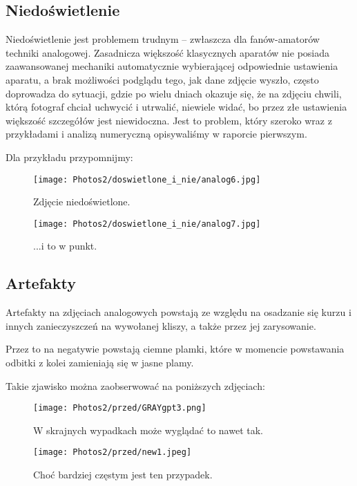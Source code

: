 \documentclass[]{mwart}
\begin{document}
\subsection{Niedoświetlenie} %
Niedoświetlenie jest problemem trudnym -- zwłaszcza dla fanów-amatorów techniki analogowej.
Zasadnicza większość klasycznych aparatów nie posiada zaawansowanej mechaniki automatycznie wybierającej
odpowiednie ustawienia aparatu, a brak możliwości podglądu tego, jak dane zdjęcie wyszło, często doprowadza
do sytuacji, gdzie po wielu dniach okazuje się, że na zdjęciu chwili, którą fotograf chciał uchwycić i utrwalić,
niewiele widać, bo przez złe ustawienia większość szczegółów jest niewidoczna. Jest to problem, który szeroko
wraz z przykładami i analizą numeryczną opisywaliśmy w raporcie pierwszym.

Dla przykładu przypomnijmy:
\newpage
\begin{figure}[H]
    \centering
    \texttt{[image: Photos2/doswietlone\_i\_nie/analog6.jpg]}
    \caption{Zdjęcie niedoświetlone.}
\end{figure}
\begin{figure}[H]
    \centering
    \texttt{[image: Photos2/doswietlone\_i\_nie/analog7.jpg]}
    \caption{...i to w punkt.}
\end{figure}



\newpage
\subsection{Artefakty}
Artefakty na zdjęciach analogowych powstają ze względu na osadzanie się kurzu i innych zanieczyszczeń na wywołanej kliszy,
a także przez jej zarysowanie.

Przez to na negatywie powstają ciemne plamki, które w momencie powstawania odbitki z kolei zamieniają się w jasne plamy.

Takie zjawisko można zaobserwować na poniższych zdjęciach:

\begin{figure}[H]
    \centering
    \texttt{[image: Photos2/przed/GRAYgpt3.png]}
    \caption{W skrajnych wypadkach może wyglądać to nawet tak.}
\end{figure}

\begin{figure}[H]
    \centering
    \texttt{[image: Photos2/przed/new1.jpeg]}
    \caption{Choć bardziej częstym jest ten przypadek.}
\end{figure}
\end{document}
